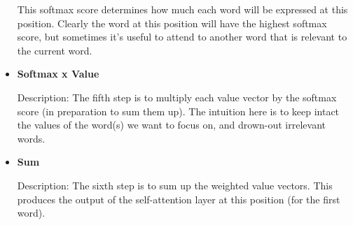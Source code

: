 \documentclass{article}
\begin{document}
\begin{itemize}
This softmax score determines how much each word will be expressed at this position. Clearly the word at this position will have the highest softmax score, but sometimes it’s useful to attend to another word that is relevant to the current word.

\item \textbf{Softmax x Value}

Description: The fifth step is to multiply each value vector by the softmax score (in preparation to sum them up). The intuition here is to keep intact the values of the word(s) we want to focus on, and drown-out irrelevant words.

\item \textbf{Sum}

Description: The sixth step is to sum up the weighted value vectors. This produces the output of the self-attention layer at this position (for the first word).
\end{itemize}
\end{document}
